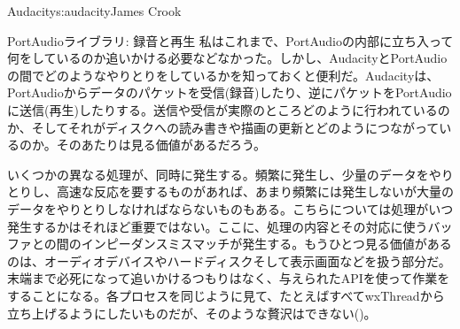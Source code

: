 \begin{aosachapter}{Audacity}{s:audacity}{James Crook}
\begin{aosasect1}{PortAudioライブラリ: 録音と再生}
私はこれまで、PortAudioの内部に立ち入って何をしているのか追いかける必要などなかった。しかし、AudacityとPortAudioの間でどのようなやりとりをしているかを知っておくと便利だ。Audacityは、PortAudioからデータのパケットを受信(録音)したり、逆にパケットをPortAudioに送信(再生)したりする。送信や受信が実際のところどのように行われているのか、そしてそれがディスクへの読み書きや描画の更新とどのようにつながっているのか。そのあたりは見る価値があるだろう。

いくつかの異なる処理が、同時に発生する。頻繁に発生し、少量のデータをやりとりし、高速な反応を要するものがあれば、あまり頻繁には発生しないが大量のデータをやりとりしなければならないものもある。こちらについては処理がいつ発生するかはそれほど重要ではない。ここに、処理の内容とその対応に使うバッファとの間のインピーダンスミスマッチが発生する。もうひとつ見る価値があるのは、オーディオデバイスやハードディスクそして表示画面などを扱う部分だ。末端まで必死になって追いかけるつもりはなく、与えられたAPIを使って作業をすることになる。各プロセスを同じように見て、たとえばすべてwxThreadから立ち上げるようにしたいものだが、そのような贅沢はできない()。



\end{aosasect1}
\end{aosachapter}
